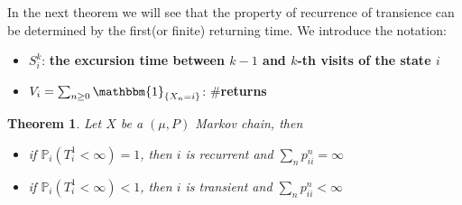 \documentclass[a4paper,11pt]{book}
\newtheorem{theorem}{Theorem}[section]
\theoremstyle{definition}
\theoremstyle{remark}
\begin{document}
In the next theorem we will see that the property of recurrence of transience can be determined by the first(or finite) returning time. We introduce the notation:
\begin{itemize}
	\item $S_i^k$: \textbf{the excursion time between $k-1$ and $k$-th visits of the state $i$}
	\item $V_i = \sum_{n \geq 0} \mathbbm{1}_{\{X_n = i\}}$: \textbf{$\#$returns}
\end{itemize}

\begin{theorem}
	Let $X$ be a $(\mu, P)$ Markov chain, then
	\begin{itemize}
		\item if $\mathbb{P}_i(T_i^1 < \infty) = 1$, then $i$ is recurrent and $\sum_n p_{ii}^n = \infty$
		\item if $\mathbb{P}_i(T_i^1 < \infty) < 1$, then $i$ is transient and $\sum_n p_{ii}^n < \infty$
	\end{itemize}
\end{theorem}
\end{document}
